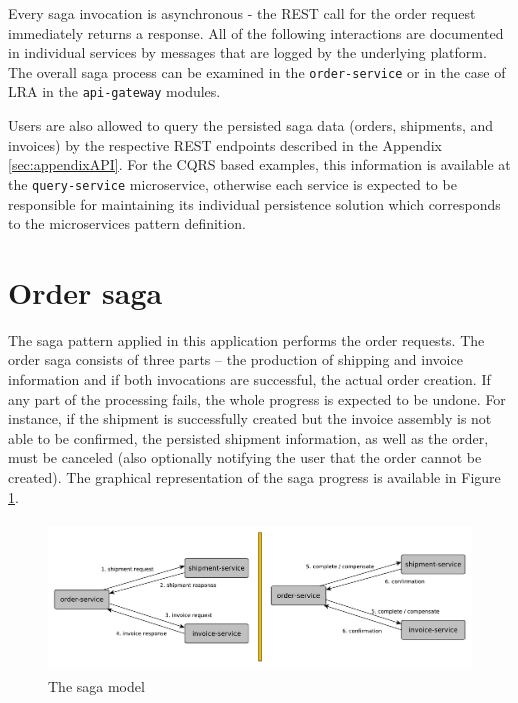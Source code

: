 \documentclass[oneside,
  digital, %
  table,   %
  lof,     %
  lot,     %
]{fithesis3}
\begin{document}
Every saga invocation is asynchronous - the REST call for the order request immediately returns a response. All of the following interactions are documented in individual services by messages that are logged by the underlying platform. The overall saga process can be examined in the \texttt{order-service} or in the case of LRA in the \texttt{api-gateway} modules.

Users are also allowed to query the persisted saga data (orders, shipments, and invoices) by the respective REST endpoints described in the Appendix \ref{sec:appendixAPI}. For the CQRS based examples, this information is available at the \texttt{query-service} microservice, otherwise each service is expected to be responsible for maintaining its individual persistence solution which corresponds to the microservices pattern definition.

\section{Order saga}

The saga pattern applied in this application performs the order requests. The order saga consists of three parts -- the production of shipping and invoice information and if both invocations are successful, the actual order creation. If any part of the processing fails, the whole progress is expected to be undone. For instance, if the shipment is successfully created but the invoice assembly is not able to be confirmed, the persisted shipment information, as well as the order, must be canceled (also optionally notifying the user that the order cannot be created). The graphical representation of the saga progress is available in Figure \ref{fig:saga-model}.

\begin{figure}
    \begin{center}
        \includegraphics[height=40mm]{images/sagaModel.pdf}
    \end{center}
    \caption{The saga model}
    \label{fig:saga-model}
\end{figure}
\end{document}
